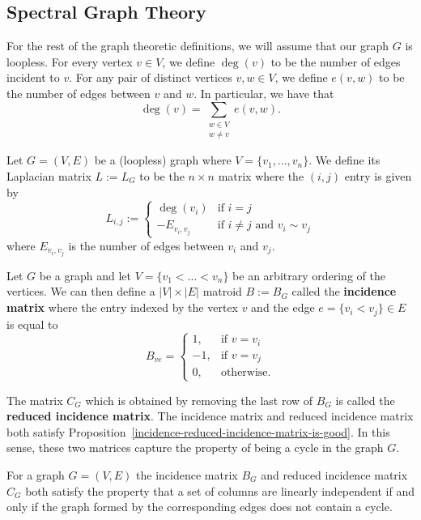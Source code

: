 \documentclass{puthesis-UG}
\begin{document}
\subsection{Spectral Graph Theory}

For the rest of the graph theoretic definitions, we will assume that our graph $G$ is loopless. For every vertex $v \in V$, we define $\deg(v)$ to be the number of edges incident to $v$. For any pair of distinct vertices $v, w \in V$, we define $e(v, w)$ to be the number of edges between $v$ and $w$. In particular, we have that 
\[
	\deg (v) = \sum_{\substack{w \in V \\ w \neq v}} e(v, w).
\]

\begin{defn}
	Let $G = (V, E)$ be a (loopless) graph where $V = \{v_1, \ldots, v_n\}$. We define its Laplacian matrix $L := L_G$ to be the $n \times n$ matrix where the $(i, j)$ entry is given by 
	\[
		L_{i, j} := \begin{cases}
			\deg (v_i) & \text{if $i = j$} \\
			-E_{v_i, v_j} & \text{if $i \neq j$ and $v_i \sim v_j$}
		\end{cases}
	\]
	where $E_{v_i, v_j}$ is the number of edges between $v_i$ and $v_j$. 
\end{defn}

\begin{defn} \label{def:incidence-matrix}
	Let $G$ be a graph and let $V = \{v_1 < \ldots < v_n\}$ be an arbitrary ordering of the vertices. We can then define a $|V| \times |E|$ matroid $B := B_G$ called the \textbf{incidence matrix} where the entry indexed by the vertex $v$ and the edge $e = \{v_i < v_j\} \in E$ is equal to 
	\[
		B_{ve} = \begin{cases}
			1, & \text{if $v = v_i$} \\
			-1, & \text{if $v = v_j$} \\
			0, & \text{otherwise.}
		\end{cases}
	\] 
\end{defn}

The matrix $C_G$ which is obtained by removing the last row of $B_G$ is called the \textbf{reduced incidence matrix}. The incidence matrix and reduced incidence matrix both satisfy Proposition~\ref{incidence-reduced-incidence-matrix-is-good}. In this sense, these two matrices capture the property of being a cycle in the graph $G$.  

\begin{prop} \label{incidence-reduced-incidence-matrix-is-good}
	For a graph $G = (V, E)$ the incidence matrix $B_G$ and reduced incidence matrix $C_G$ both satisfy the property that a set of columns are linearly independent if and only if the graph formed by the corresponding edges does not contain a cycle. 
\end{prop}
\end{document}
